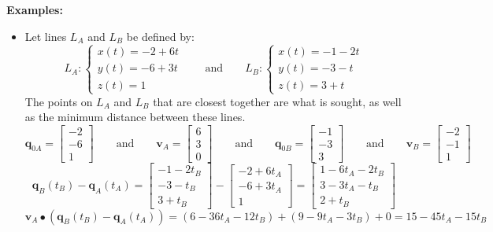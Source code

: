 \documentclass{article}
\begin{document}
\textbf{Examples:}
\begin{itemize}
\item Let lines \(L_A\) and \(L_B\) be defined by:
\[L_A : \left\{\begin{array}{c}
x(t) = -2 + 6t \\ 
y(t) = -6 + 3t \\ 
z(t) = 1 
\end{array}\right. \quad\quad\text{and}\quad\quad L_B : \left\{\begin{array}{c}
x(t) = -1 - 2t \\ 
y(t) = -3 - t \\ 
z(t) = 3 + t 
\end{array}\right.\]
The points on \(L_A\) and \(L_B\) that are closest together are what is sought, as well as the minimum distance between these lines.
\[\mathbf{q}_{0A} = \begin{bmatrix} -2 \\ -6 \\ 1 \end{bmatrix} 
\quad\quad\text{and}\quad\quad 
\mathbf{v}_A = \begin{bmatrix} 6 \\ 3 \\ 0 \end{bmatrix}
\quad\quad\text{and}\quad\quad 
\mathbf{q}_{0B} = \begin{bmatrix} -1 \\ -3 \\ 3 \end{bmatrix}
\quad\quad\text{and}\quad\quad
\mathbf{v}_B = \begin{bmatrix} -2 \\ -1 \\ 1 \end{bmatrix}\] 
\[\mathbf{q}_B(t_B) - \mathbf{q}_A(t_A) = \begin{bmatrix}
-1 - 2t_B \\ 
-3 - t_B \\ 
3 + t_B 
\end{bmatrix} - \begin{bmatrix}
-2 + 6t_A \\ 
-6 + 3t_A \\ 
1
\end{bmatrix} = \begin{bmatrix}
1 - 6t_A - 2t_B \\ 
3 - 3t_A - t_B \\ 
2 + t_B
\end{bmatrix}\]
\[\mathbf{v}_A \bullet (\mathbf{q}_B(t_B) - \mathbf{q}_A(t_A)) = (6 - 36t_A - 12t_B) + (9 - 9t_A - 3t_B) + 0 = 15 - 45t_A - 15t_B\]

\end{itemize}
\end{document}

